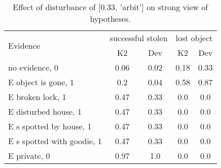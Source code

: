 \begin{table}\begin{tabular}{l|cc|cc}\toprule\multirow{2}{*}{Evidence} & \multicolumn{2}{c}{successful stolen}& \multicolumn{2}{c}{lost object}\\& {K2} & {Dev}& {K2} & {Dev}\\\midrule
no evidence, 0 & 0.06&0.02&\cellcolor{Bittersweet}0.18&\cellcolor{Bittersweet}0.33\\E object is gone, 1 & \cellcolor{Bittersweet}0.2&\cellcolor{Bittersweet}0.04&\cellcolor{Bittersweet}0.58&\cellcolor{Bittersweet}0.87\\E broken lock, 1 & \cellcolor{Bittersweet}0.47&\cellcolor{Bittersweet}0.33&0.0&0.0\\E disturbed house, 1 & \cellcolor{Bittersweet}0.47&\cellcolor{Bittersweet}0.33&0.0&0.0\\E s spotted by house, 1 & \cellcolor{Bittersweet}0.47&\cellcolor{Bittersweet}0.33&0.0&0.0\\E s spotted with goodie, 1 & \cellcolor{Bittersweet}0.47&\cellcolor{Bittersweet}0.33&0.0&0.0\\E private, 0 & 0.97&1.0&0.0&0.0\\\bottomrule\end{tabular}\caption{Effect of disturbance of [0.33, 'arbit'] on strong view of hypotheses.}\end{table}
